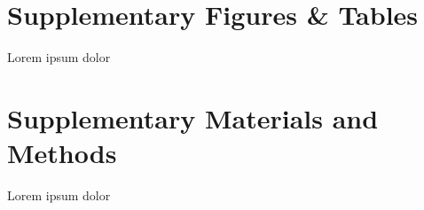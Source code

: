 



\section{Supplementary Figures \& Tables}
Lorem ipsum dolor

\newpage

\section{Supplementary Materials and Methods}
Lorem ipsum dolor

\newpage










